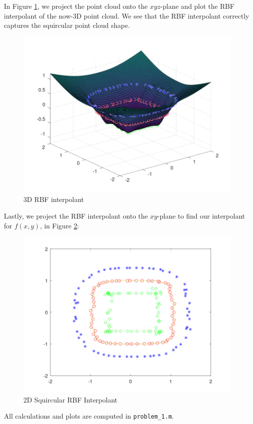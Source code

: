 \begin{solution}
  \pagebreak
  In Figure \ref{fig:problem_1ii}, we project the point cloud onto the $xyz$-plane and plot the RBF interpolant of the
  now-3D point cloud. We see that the RBF interpolant correctly captures the squircular point cloud shape.

  \begin{figure}[h]
    \centering
    \includegraphics*[width=\textwidth]{problem_1ii.png}
    \caption{3D RBF interpolant}
    \label{fig:problem_1ii}
  \end{figure}

  \pagebreak
  Lastly, we project the RBF interpolant onto the $xy$-plane to find our interpolant for $f(x, y)$, in Figure 
  \ref{fig:problem_1iii}:

  \begin{figure}[h]
    \centering
    \includegraphics*[width=\textwidth]{problem_1iii.png}
    \caption{2D Squircular RBF Interpolant}
    \label{fig:problem_1iii}
  \end{figure}

  All calculations and plots are computed in \texttt{problem\_1.m}.
\end{solution}